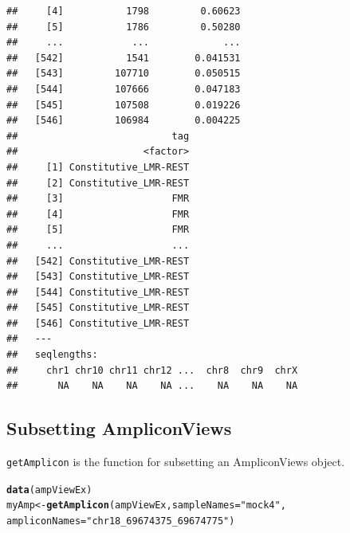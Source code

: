 \documentclass{article}\usepackage[]{graphicx}\usepackage[]{color}
\makeatletter
\newcommand{\hlstr}[1]{\textcolor[rgb]{0.192,0.494,0.8}{#1}}%
\newcommand{\hlstd}[1]{\textcolor[rgb]{0.345,0.345,0.345}{#1}}%
\newcommand{\hlkwb}[1]{\textcolor[rgb]{0.69,0.353,0.396}{#1}}%
\newcommand{\hlkwc}[1]{\textcolor[rgb]{0.333,0.667,0.333}{#1}}%
\newcommand{\hlkwd}[1]{\textcolor[rgb]{0.737,0.353,0.396}{\textbf{#1}}}%
\newenvironment{kframe}{%
 \def\at@end@of@kframe{}%
 \ifinner\ifhmode%
  \def\at@end@of@kframe{\end{minipage}}%
  \begin{minipage}{\columnwidth}%
 \fi\fi%
 \def\FrameCommand##1{\hskip\@totalleftmargin \hskip-\fboxsep
 \colorbox{shadecolor}{##1}\hskip-\fboxsep
     \hskip-\linewidth \hskip-\@totalleftmargin \hskip\columnwidth}%
 \MakeFramed {\advance\hsize-\width
   \@totalleftmargin\z@ \linewidth\hsize
   \@setminipage}}%
 {\par\unskip\endMakeFramed%
 \at@end@of@kframe}
\newenvironment{knitrout}{}{} %
\makeatother
\begin{document}
\begin{knitrout}
\begin{kframe}
\begin{verbatim}
##     [4]           1798         0.60623
##     [5]           1786         0.50280
##     ...            ...             ...
##   [542]           1541        0.041531
##   [543]         107710        0.050515
##   [544]         107666        0.047183
##   [545]         107508        0.019226
##   [546]         106984        0.004225
##                           tag
##                      <factor>
##     [1] Constitutive_LMR-REST
##     [2] Constitutive_LMR-REST
##     [3]                   FMR
##     [4]                   FMR
##     [5]                   FMR
##     ...                   ...
##   [542] Constitutive_LMR-REST
##   [543] Constitutive_LMR-REST
##   [544] Constitutive_LMR-REST
##   [545] Constitutive_LMR-REST
##   [546] Constitutive_LMR-REST
##   ---
##   seqlengths:
##     chr1 chr10 chr11 chr12 ...  chr8  chr9  chrX
##       NA    NA    NA    NA ...    NA    NA    NA
\end{verbatim}
\end{kframe}
\end{knitrout}

\subsection{Subsetting AmpliconViews}
\texttt{getAmplicon} is the function for subsetting an AmpliconViews object.
\begin{knitrout}
\color{fgcolor}\begin{kframe}
\begin{alltt}
\hlkwd{data}\hlstd{(ampViewEx)}
\hlstd{myAmp} \hlkwb{<-} \hlkwd{getAmplicon}\hlstd{(ampViewEx,} \hlkwc{sampleNames} \hlstd{=} \hlstr{"mock4"}\hlstd{,}
    \hlkwc{ampliconNames} \hlstd{=} \hlstr{"chr18_69674375_69674775"}\hlstd{)}
\end{alltt}
\end{kframe}
\end{knitrout}
\end{document}
